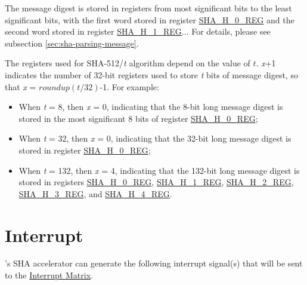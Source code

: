 \documentclass[main\_\_EN.tex]{subfiles}
\begin{document}
\begin{table}[H]
\begin{threeparttable}
    \begin{tablenotes}
        \item[1] The message digest is stored in registers from most significant bits to the least significant bits, with the first word stored in register \hyperref[regdesc:SHAHNREG]{SHA\_H\_0\_REG} and the second word stored in register \hyperref[regdesc:SHAHNREG]{SHA\_H\_1\_REG}... For details, please see subsection \ref{sec:sha-parsing-message}.
        \item[2] The registers used for SHA-512/{\it{t}} algorithm depend on the value of \begin{math}t\end{math}. {\it{x}}+1 indicates the number of 32-bit registers used to store {\it{t}} bits of message digest, so that {\it{x}} = \begin{math}roundup(t/32)\end{math}-1. For example:
            \begin{itemize}
                \item When {\it{t}} = 8, then {\it{x}} = 0, indicating that the 8-bit long message digest is stored in the most significant 8 bits of register \hyperref[regdesc:SHAHNREG]{SHA\_H\_0\_REG};
                \item When {\it{t}} = 32, then {\it{x}} = 0, indicating that the 32-bit long message digest is stored in register \hyperref[regdesc:SHAHNREG]{SHA\_H\_0\_REG};
                \item When {\it{t}} = 132, then {\it{x}} = 4, indicating that the 132-bit long message digest is stored in registers \hyperref[regdesc:SHAHNREG]{SHA\_H\_0\_REG}, \hyperref[regdesc:SHAHNREG]{SHA\_H\_1\_REG}, \hyperref[regdesc:SHAHNREG]{SHA\_H\_2\_REG}, \hyperref[regdesc:SHAHNREG]{SHA\_H\_3\_REG}, and \hyperref[regdesc:SHAHNREG]{SHA\_H\_4\_REG}.
            \end{itemize}
    \end{tablenotes}

    \end{threeparttable}
\end{table}



\section{Interrupt}

\chipname{}'s SHA accelerator can generate the following interrupt signal(s) that will be sent to the \hyperref[mod:intmtrx]{Interrupt Matrix}.
\end{document}
